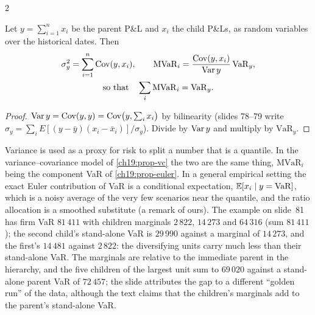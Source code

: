 \begin{paracol}{2}
\begin{proposition}\label{ch19:prop-hsmarg}
Let $y=\sum_{i=1}^nx_i$ be the parent P\&L and $x_i$ the child P\&Ls, as random variables over the historical dates. Then
\[
\begin{gathered}
  \sigma_y^2=\sum_{i=1}^n\operatorname{Cov}(y,x_i),\qquad
  \mathrm{MVaR}_i=\frac{\operatorname{Cov}(y,x_i)}{\operatorname{Var} y}\,\mathrm{VaR}_y,\\
  \text{so that}\quad\sum_i\mathrm{MVaR}_i=\mathrm{VaR}_y .
\end{gathered}
\]
\end{proposition}
\begin{proof}
$\operatorname{Var} y=\operatorname{Cov}(y,y)=\operatorname{Cov}\bigl(y,\sum_ix_i\bigr)$ by bilinearity (slides 78--79 write $\sigma_y=\sum_iE[(y-\bar y)(x_i-\bar x_i)]/\sigma_y$). Divide by $\operatorname{Var} y$ and multiply by $\mathrm{VaR}_y$.
\end{proof}
Variance is used as a proxy for risk to split a number that is a quantile. In the variance--covariance model of \cref{ch19:prop-vc} the two are the same thing, $\mathrm{MVaR}_i$ being the component VaR of \cref{ch19:prop-euler}. In a general empirical setting the exact Euler contribution of VaR is a conditional expectation, $\mathbb{E}[x_i\mid y=\mathrm{VaR}]$, which is a noisy average of the very few scenarios near the quantile, and the ratio allocation is a smoothed substitute (a remark of ours). The example on slide~81 has firm VaR $81\,411$ with children marginals $2\,822$, $14\,273$ and $64\,316$ (sum $81\,411$); the second child's stand-alone VaR is $29\,990$ against a marginal of $14\,273$, and the first's $14\,481$ against $2\,822$: the diversifying units carry much less than their stand-alone VaR. The marginals are relative to the immediate parent in the hierarchy, and the five children of the largest unit sum to $69\,020$ against a stand-alone parent VaR of $72\,457$; the slide attributes the gap to a different ``golden run'' of the data, although the text claims that the children's marginals add to the parent's stand-alone VaR.


\end{paracol}

